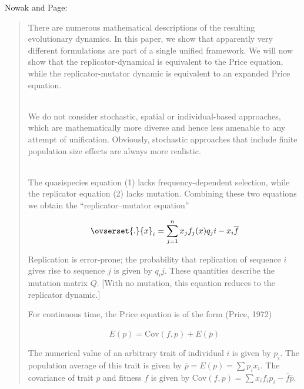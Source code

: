 \documentclass[a4paper,10pt]{article}
\begin{document}
Nowak and Page:
\begin{quotation}
\cite{page2002-unifyingEvolutionaryDynamics}
    There are numerous mathematical descriptions of the resulting evolutionary dynamics.
    In this paper, we show that apparently very different formulations are part of a single unified framework.
    We will now show that the replicator-dynamical is equivalent to the Price equation, while the replicator-mutator dynamic is equivalent to an expanded Price equation.
    
    \\
    
    We do not consider stochastic, spatial or individual-based approaches, which are mathematically more diverse and hence less amenable to any attempt of unification.
    Obviously, stochastic approaches that include finite population size effects are always more realistic.
    
    \\
    
    The quasispecies equation (1) lacks frequency-dependent selection, while the replicator equation (2) lacks mutation.
    Combining these two equations we obtain the ``replicator–mutator equation''
    
    \begin{equation}
        \ovserset{.}{x}_i = \sum^n_{j=1} x_j f_j(x) q_ji - x_i \overline{f}  
    \end{equation}
    
    Replication is error-prone; the probability that replication of sequence $i$ gives rise to sequence $j$ is given by $q_ij$.
    These quantities describe the mutation matrix $Q$.
    [With no mutation, this equation reduces to the replicator dynamic.]
    
    For continuous time, the Price equation is of the form (Price, 1972)
    
    \begin{equation}
    \overset{.}{E}(p) = \text{Cov}(f,p) + E(\overset{.}{p})
    \end{equation}
    
    The numerical value of an arbitrary trait of individual $i$ is given by $p_i$. The population average of this trait is given by $\overline{p} = E(p) = \sum p_i x_i$.
    The covariance of trait $p$ and fitness $f$ is given by $\text{Cov}(f,p)=\sum x_i f_i p_i - \overline{f}\overline{p}$.
    
\end{quotation}
\end{document}
